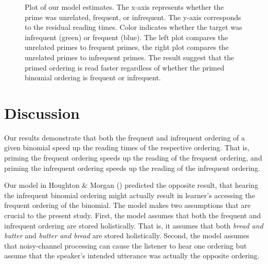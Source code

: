 \documentclass[
  12pt,
]{scrartcl}
\begin{document}
\begin{figure}[htbp]

\caption{\label{fig-fullresults}Plot of our model estimates. The x-axis
represents whether the prime was unrelated, frequent, or infrequent. The
y-axis corresponds to the residual reading times. Color indicates
whether the target was infrequent (green) or frequent (blue). The left
plot compares the unrelated primes to frequent primes, the right plot
compares the unrelated primes to infrequent primes. The result suggest
that the primed ordering is read faster regardless of whether the primed
binomial ordering is frequent or infrequent.}


\end{figure}%

\section{Discussion}\label{discussion}

Our results demonstrate that both the frequent and infrequent ordering
of a given binomial speed up the reading times of the respective
ordering. That is, priming the frequent ordering speeds up the reading
of the frequent ordering, and priming the infrequent ordering speeds up
the reading of the infrequent ordering.

Our model in Houghton \& Morgan
()
predicted the opposite result, that hearing the infrequent binomial
ordering might actually result in learner's accessing the frequent
ordering of the binomial. The model makes two assumptions that are
crucial to the present study. First, the model assumes that both the
frequent and infrequent ordering are stored holistically. That is, it
assumes that both \emph{bread and butter} and \emph{butter and bread}
are stored holistically. Second, the model assumes that noisy-channel
processing can cause the listener to hear one ordering but assume that
the speaker's intended utterance was actually the opposite ordering.
\end{document}
